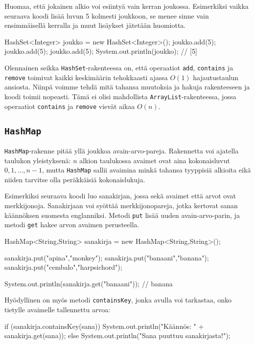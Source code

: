 Huomaa, että jokainen alkio voi esiintyä vain kerran joukossa.
Esimerkiksi vaikka seuraava koodi lisää luvun 5 kolmesti
joukkoon, se menee sinne vain ensimmäisellä kerralla ja
muut lisäykset jätetään huomiotta.

\begin{code}
HashSet<Integer> joukko = new HashSet<Integer>();
joukko.add(5);
joukko.add(5);
joukko.add(5);
System.out.println(joukko); // [5]
\end{code}

Olennainen seikka \texttt{HashSet}-rakenteessa on,
että operaatiot \texttt{add}, \texttt{contains} ja \texttt{remove}
toimivat kaikki keskimäärin tehokkaasti ajassa $O(1)$
hajautustaulun ansiosta.
Niinpä voimme tehdä mitä tahansa muutoksia ja hakuja
rakenteeseen ja koodi toimii nopeasti.
Tämä ei olisi mahdollista \texttt{ArrayList}-rakenteessa,
jossa operaatiot \texttt{contains} ja \texttt{remove}
vievät aikaa $O(n)$.

\subsection{\texttt{HashMap}}

\texttt{HashMap}-rakenne pitää yllä joukkoa avain-arvo-pareja.
Rakennetta voi ajatella taulukon yleistyksenä:
$n$ alkion taulukossa avaimet ovat aina kokonaisluvut
$0,1,\ldots,n-1$, mutta \texttt{HashMap} sallii
avaimina minkä tahansa tyyppisiä alkioita eikä niiden
tarvitse olla peräkkäisiä kokonaislukuja.

Esimerkiksi seuraava koodi luo sanakirjan, jossa sekä
avaimet että arvot ovat merkkijonoja.
Sanakirjaan voi syöttää merkkijonopareja, jotka kertovat
sanan käännöksen suomesta englanniksi.
Metodi \texttt{put} lisää uuden avain-arvo-parin,
ja metodi \texttt{get} hakee arvon avaimen perusteella.

\begin{code}
HashMap<String,String> sanakirja = new HashMap<String,String>();

sanakirja.put("apina","monkey");
sanakirja.put("banaani","banana");
sanakirja.put("cembalo","harpsichord");

System.out.println(sanakirja.get("banaani")); // banana
\end{code}

Hyödyllinen on myös metodi \texttt{containsKey},
jonka avulla voi tarkastaa, onko tietylle avaimelle
tallennettu arvoa:

\begin{code}
if (sanakirja.containsKey(sana)) {
    System.out.println("Käännös: " + sanakirja.get(sana));
} else {
    System.out.println("Sana puuttuu sanakirjasta!");
}
\end{code}

